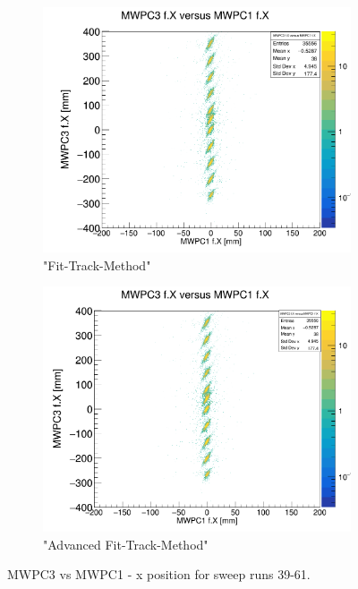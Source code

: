 \documentclass[12pt, letterpaper]{article}
\begin{document}
\begin{figure}[!htbp]
\begin{subfigure}{.5\textwidth}
\end{subfigure}
\begin{subfigure}{.5\textwidth}
  \centering
  \includegraphics[width=.9\linewidth]{plot_imgs/mw3_mw1_fit.png} 
  \caption{"Fit-Track-Method"}
  \label{fig:sub-second}
\end{subfigure}
\begin{subfigure}{.5\textwidth}
  \centering
  \includegraphics[width=.9\linewidth]{plot_imgs/mw3_mw1_last.png} 
  \caption{"Advanced Fit-Track-Method"}
  \label{fig:sub-second}
\end{subfigure}
\caption{MWPC3 vs MWPC1 - x position for sweep runs 39-61.}
\label{fig:fig}
\end{figure}
\FloatBarrier
\clearpage
\end{document}
